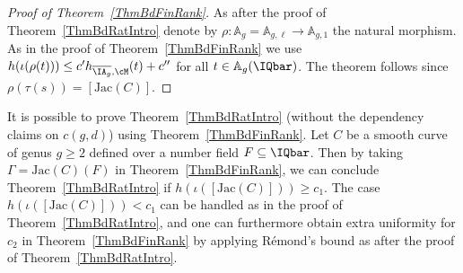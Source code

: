 \begin{proof}[Proof of Theorem~\ref{ThmBdFinRank}]
  As after the proof of Theorem~\ref{ThmBdRatIntro}
  denote by $\rho \colon \mathbb{A}_g = \mathbb{A}_{g,\ell}
  \rightarrow \mathbb{A}_{g,1}$ the natural morphism.
  As in the proof of Theorem~\ref{ThmBdFinRank} we use
  $h(\iota(\rho(t)))\le c'h_{\overline{\IA_{g}},\cM}(t)  + c''$ for all $t\in
  \mathbb{A}_g(\IQbar)$.
  The theorem follows since $\rho(\tau(s)) = [\mathrm{Jac}(C)]$.
\end{proof}
\begin{remark}
\notready
It is possible to prove Theorem~\ref{ThmBdRatIntro} (without the
dependency claims on $c(g,d)$) using
Theorem~\ref{ThmBdFinRank}. Let $C$ be a smooth curve of genus $g \ge
2$ defined over a number field $F \subseteq \IQbar$. Then by taking $\Gamma =
\mathrm{Jac}(C)(F)$ in Theorem~\ref{ThmBdFinRank}, we can conclude
Theorem~\ref{ThmBdRatIntro} if $h(\iota([\mathrm{Jac}(C)])) \ge c_1$.
  The case $h(\iota([\mathrm{Jac}(C)])) < c_1$ can be
  handled as in the
  proof of Theorem~\ref{ThmBdRatIntro}, and one can furthermore obtain
  extra uniformity
  for $c_2$ in Theorem~\ref{ThmBdFinRank} by applying R\'emond's bound
  \cite[page~643]{DPvarabII} as after the proof of Theorem~\ref{ThmBdRatIntro}.%
\end{remark}

